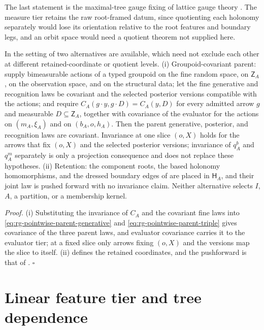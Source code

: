 The last statement is the maximal-tree gauge fixing of lattice gauge theory \citep{Creutz1977}. The
measure tier retains the raw root-framed datum, since quotienting each holonomy separately would lose its
orientation relative to the root features and boundary legs, and an orbit space would need a quotient
theorem not supplied here.

In the setting of  two alternatives are available, which need not
exclude each other at different retained-coordinate or quotient levels. (i) Groupoid-covariant parent:
supply bimeasurable actions of a typed groupoid on the fine random space, on $\mathsf Z_A$, on the
observation space, and on the structural data; let the fine generative and recognition laws be covariant
and the selected posterior versions compatible with the actions; and require
$C_A(g\cdot y,g\cdot D)=C_A(y,D)$ for every admitted arrow $g$ and measurable $D\subseteq\mathsf Z_A$,
together with covariance of the evaluator for the actions on $(m_A,\xi_A)$ and on $(b_A,o,h_A)$. Then the
parent generative, posterior, and recognition laws are covariant. Invariance at one slice $(o,X)$ holds for
the arrows that fix $(o,X)$ and the selected posterior versions; invariance of $q^b_A$ and $q^m_A$
separately is only a projection consequence and does not replace these hypotheses. (ii) Retention: the
component roots, the based holonomy homomorphisms, and the dressed boundary edges of
 are placed in $\mathsf H_A$, and their joint law is pushed forward with no
invariance claim. Neither alternative selects $I$, $A$, a partition, or a membership kernel.

\noindent\emph{Proof.}
(i) Substituting the invariance of $C_A$ and the covariant fine laws into
\eqref{eq:rg-pointwise-parent-generative} and \eqref{eq:rg-pointwise-parent-triple} gives covariance of the
three parent laws, and evaluator covariance carries it to the evaluator tier; at a fixed slice only arrows
fixing $(o,X)$ and the versions map the slice to itself. (ii) defines the retained coordinates, and the
pushforward is that of . $\square$

\section{Linear feature tier and tree dependence}

